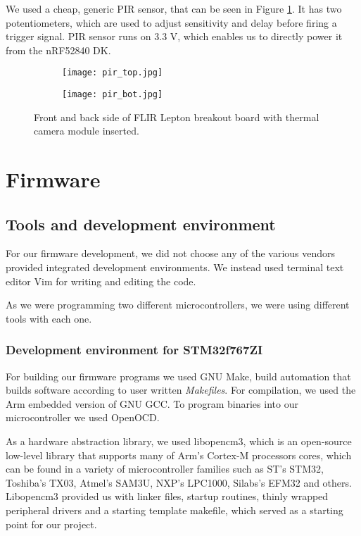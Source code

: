 We used a cheap, generic PIR sensor, that can be seen in Figure \ref{pir_sensor}.
It has two potentiometers, which are used to adjust sensitivity and delay before firing a trigger signal.
PIR sensor runs on 3.3 V, which enables us to directly power it from the nRF52840 DK. 

\begin{figure}[ht] 
    \begin{subfigure}[b]{0.5\textwidth}
        \centering
        \texttt{[image: pir\_top.jpg]} 
    \end{subfigure}
    \begin{subfigure}[b]{0.5\textwidth}
        \centering
        \texttt{[image: pir\_bot.jpg]} 
    \end{subfigure}
    \caption{ Front and back side of FLIR Lepton breakout board with thermal camera module inserted.}
    \label{pir_sensor}
\end{figure}

\section{ Firmware}
\subsection{ Tools and development environment}

For our firmware development, we did not choose any of the various vendors provided integrated development environments.
We instead used terminal text editor Vim for writing and editing the code.

As we were programming two different microcontrollers, we were using different tools with each one.


\subsubsection{ Development environment for STM32f767ZI}

For building our firmware programs we used GNU Make, build automation that builds software according to user written \textit{Makefiles}.
For compilation, we used the Arm embedded version of GNU GCC.
To program binaries into our microcontroller we used OpenOCD.

As a hardware abstraction library, we used libopencm3, which is an open-source low-level library that supports many of Arm's Cortex-M processors cores, which can be found in a variety of microcontroller families such as ST's STM32, Toshiba's TX03, Atmel's SAM3U, NXP's LPC1000, Silabs's EFM32 and others.
Libopencm3 provided us with linker files, startup routines, thinly wrapped peripheral drivers and a starting template makefile, which served as a starting point for our project.

